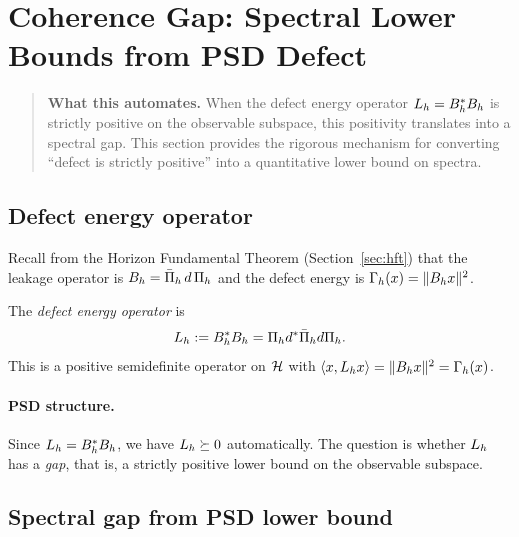 \section{Coherence Gap: Spectral Lower Bounds from PSD Defect}
\label{sec:coherence-gap}

\begin{quote}\small
\textbf{What this automates.}
When the defect energy operator $\CCDefOp{d}{h} = \CCLeak{d}{h}^* \CCLeak{d}{h}$ is strictly positive on the observable subspace, this positivity translates into a spectral gap.
This section provides the rigorous mechanism for converting ``defect is strictly positive'' into a quantitative lower bound on spectra.
\end{quote}

\subsection{Defect energy operator}

Recall from the Horizon Fundamental Theorem (Section~\ref{sec:hft}) that the leakage operator is $\CCLeak{d}{h} = \CCLeakExpr{d}{h}$ and the defect energy is $\CCDefEnergy{h}{x} = \|\CCLeak{d}{h} x\|^2$.

\begin{definition}
\label{def:defect-energy-gap-operator}
The \emph{defect energy operator} is
\[
\CCDefOp{d}{h} := \CCLeak{d}{h}^* \CCLeak{d}{h} = \CCPi{h} d^* \CCPibar{h} d \CCPi{h}.
\]
This is a positive semidefinite operator on $\cH$ with $\langle x, \CCDefOp{d}{h} x \rangle = \|\CCLeak{d}{h} x\|^2 = \CCDefEnergy{h}{x}$.
\end{definition}

\paragraph{PSD structure.}
Since $\CCDefOp{d}{h} = \CCLeak{d}{h}^* \CCLeak{d}{h}$, we have $\CCDefOp{d}{h} \succeq 0$ automatically.
The question is whether $\CCDefOp{d}{h}$ has a \emph{gap}, that is, a strictly
positive lower bound on the observable subspace.

\subsection{Spectral gap from PSD lower bound}

